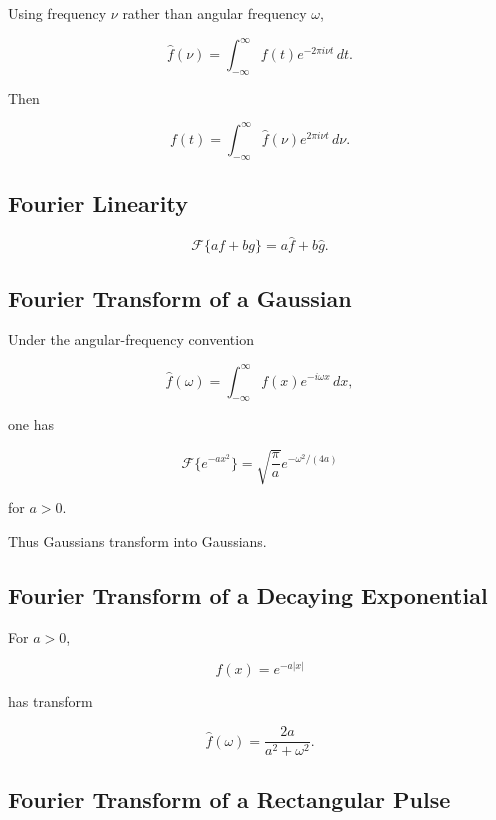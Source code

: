 Using frequency \(\nu\) rather than angular frequency \(\omega\),

\[
\boxed{
\widehat{f}(\nu)
=
\int_{-\infty}^{\infty}
f(t)e^{-2\pi i\nu t}
\,dt.
}
\]

Then

\[
\boxed{
f(t)
=
\int_{-\infty}^{\infty}
\widehat{f}(\nu)
e^{2\pi i\nu t}
\,d\nu.
}
\]

\subsection{Fourier Linearity}
\label{subsec:fourier-linearity-reference}

\[
\boxed{
\mathcal{F}\{af+bg\}
=
a\widehat f
+
b\widehat g.
}
\]

\subsection{Fourier Transform of a Gaussian}
\label{subsec:fourier-gaussian-reference}

Under the angular-frequency convention

\[
\widehat f(\omega)
=
\int_{-\infty}^{\infty}
f(x)e^{-i\omega x}
\,dx,
\]

one has

\[
\boxed{
\mathcal{F}\{e^{-ax^2}\}
=
\sqrt{
\frac{\pi}{a}
}
e^{-\omega^2/(4a)}
}
\]

for \(a>0\).

Thus Gaussians transform into Gaussians.

\subsection{Fourier Transform of a Decaying Exponential}
\label{subsec:fourier-decaying-exponential}

For \(a>0\),

\[
f(x)
=
e^{-a|x|}
\]

has transform

\[
\boxed{
\widehat f(\omega)
=
\frac{
2a
}{
a^2+\omega^2
}.
}
\]

\subsection{Fourier Transform of a Rectangular Pulse}
\label{subsec:fourier-rectangular-pulse}

